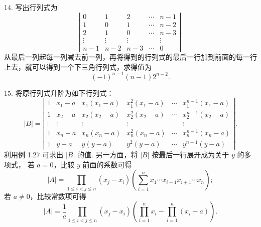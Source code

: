 \documentclass[UTF8, 12pt, fontset=fandol, oneside]{ctexart}
\begin{document}
14. 写出行列式为
\[
\left|\begin{array}{ccccc}
0&1&2&\cdots&n-1\\
1&0&1&\cdots&n-2\\
2&1&0&\cdots&n-3\\
\vdots&\vdots&\vdots&&\vdots\\
n-1&n-2&n-3&\cdots&0
\end{array}\right|.
\]
从最后一列起每一列减去前一列，再将得到的行列式的最后一行加到前面的每一行上去，就可以得到一个下三角行列式，求得值为
\[
(-1)^{n-1}(n-1)2^{n-2}.
\]

15. 将原行列式升阶为如下行列式：
\[
|B|=\left|\begin{array}{cccccc}
1&x_1-a&x_1(x_1-a)&x_1^2(x_1-a)&\cdots&x_1^{n-1}(x_1-a)\\
1&x_2-a&x_2(x_2-a)&x_2^2(x_2-a)&\cdots&x_2^{n-1}(x_2-a)\\
\vdots&\vdots&\vdots&\vdots&&\vdots\\
1&x_n-a&x_n(x_n-a)&x_n^2(x_n-a)&\cdots&x_n^{n-1}(x_n-a)\\
1&y-a&y(y-a)&y^2(y-a)&\cdots&y^{n-1}(y-a)
\end{array}\right|.
\]
利用例 1.27 可求出 $|B|$ 的值. 另一方面，将 $|B|$ 按最后一行展开成为关于 $y$ 的多项式，
若 $a=0$，比较 $y$ 前面的系数可得
\[
|A|=\prod_{1\le i<j\le n}(x_j-x_i)\left(\sum_{i=1}^n x_1\cdots x_{i-1}x_{i+1}\cdots x_n\right);
\]
若 $a\ne0$，比较常数项可得
\[
|A|=\frac1a\prod_{1\le i<j\le n}(x_j-x_i)
\left(\prod_{i=1}^n x_i-\prod_{i=1}^n(x_i-a)\right).
\]
\end{document}

